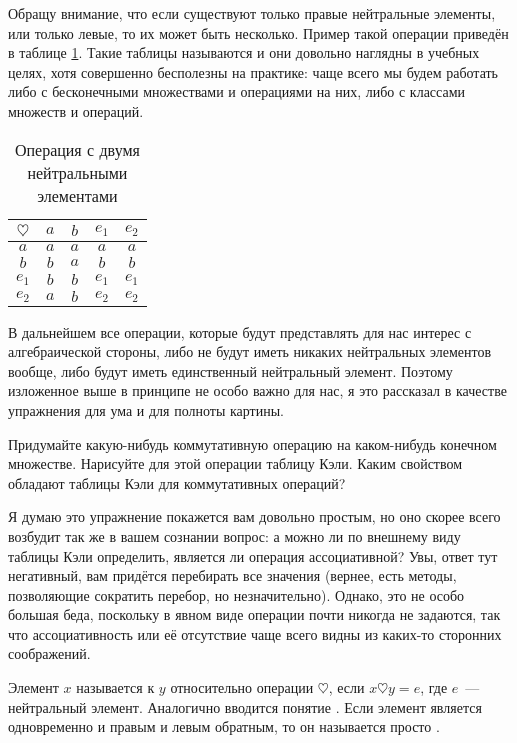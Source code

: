 Обращу внимание, что если существуют только правые нейтральные элементы, или только левые, то их может быть несколько. Пример такой операции приведён в таблице \ref{tb:alg_2neutr}. Такие таблицы называются  и они довольно наглядны в учебных целях, хотя совершенно бесполезны на практике: чаще всего мы будем работать либо с бесконечными множествами и операциями на них, либо с классами множеств и операций.

\begin{table}[h]\label{tb:alg_2neutr}
\centering
\begin{tabular}{c|cccc}
$\heartsuit$ & $a$ & $b$ & $e_1$ & $e_2$ \\
\hline
$a$ & $a$ & $a$ & $a$ & $a$ \\
$b$ & $b$ & $a$ & $b$ & $b$ \\
$e_1$ & $b$ & $b$ & $e_1$ & $e_1$ \\
$e_2$ & $a$ & $b$ & $e_2$ & $e_2$
\end{tabular}
\caption{Операция с двумя нейтральными элементами}
\end{table}

В дальнейшем все операции, которые будут представлять для нас интерес с алгебраической стороны, либо не будут иметь никаких нейтральных элементов вообще, либо будут иметь единственный нейтральный элемент. Поэтому изложенное выше в принципе не особо важно для нас, я это рассказал в качестве упражнения для ума и для полноты картины.

\begin{exercise}
Придумайте какую-нибудь коммутативную операцию на каком-нибудь конечном множестве. Нарисуйте для этой операции таблицу Кэли. Каким свойством обладают таблицы Кэли для коммутативных операций?
\end{exercise}

Я думаю это упражнение покажется вам довольно простым, но оно скорее всего возбудит так же в вашем сознании вопрос: а можно ли по внешнему виду таблицы Кэли определить, является ли операция ассоциативной? Увы, ответ тут негативный, вам придётся перебирать все значения (вернее, есть методы, позволяющие сократить перебор, но незначительно). Однако, это не особо большая беда, поскольку в явном виде операции почти никогда не задаются, так что ассоциативность или её отсутствие чаще всего видны из каких-то сторонних соображений.

\begin{definition}
Элемент $x$ называется  к $y$ относительно операции $\heartsuit$, если
$x\heartsuit y = e$, 
где $e$~--- нейтральный элемент. Аналогично вводится понятие . Если элемент является одновременно и правым и левым обратным, то он называется просто .
\end{definition}

